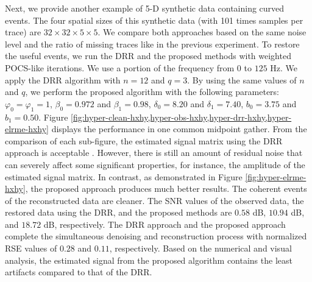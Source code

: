 
Next, we provide another example of 5-D synthetic data containing curved events. The four spatial sizes of this synthetic data (with 101 times samples per trace) are $32\times32\times5\times5$. We compare both approaches based on the same noise level and the ratio of missing traces like  in the previous experiment. To restore the useful events, we run the DRR and the proposed methods with  weighted POCS-like iterations. We use a portion of the frequency  from $0$ to $125$ Hz. We apply the DRR algorithm with ${n} = 12$ and ${q} = 3$. By using the same values of ${n}$ and ${q}$, we perform the proposed algorithm with the following parameters: ${\varphi_0 = \varphi_1} = 1$, ${\beta_0} = 0.972$ and ${\beta_1} = 0.98$, ${\delta_0} = 8.20$ and ${\delta_1} = 7.40$, ${b_0} = 3.75$ and ${b_1} = 0.50$. Figure \ref{fig:hyper-clean-hxhy,hyper-obs-hxhy,hyper-drr-hxhy,hyper-elrme-hxhy} displays the performance in one common midpoint gather. 
 From the comparison of each sub-figure, the estimated signal matrix using the DRR approach is acceptable . However, there is still an  amount of residual noise that can severely affect some significant properties, for instance, the amplitude of the estimated signal matrix. In contrast, as demonstrated in Figure \ref{fig:hyper-elrme-hxhy}, the proposed approach produces much better results. The coherent events of the reconstructed data are cleaner. The SNR values of the observed data, the restored data using the DRR, and the proposed methods are $0.58$ dB, $10.94$ dB, and $18.72$ dB, respectively. The DRR approach and the proposed approach complete the simultaneous denoising and reconstruction process with normalized RSE values of $0.28$ and $0.11$, respectively. Based on the numerical and visual analysis, the estimated signal from the proposed algorithm contains the least artifacts compared to that of the DRR.  

